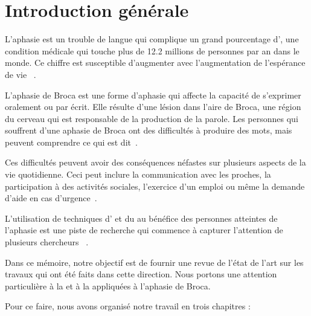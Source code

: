 \chapter*{Introduction générale}
\label{chap.intro}

L'aphasie est un trouble de langue qui complique un grand pourcentage d',
une condition médicale qui touche plus de 12.2 millions de personnes par an dans le monde.
Ce chiffre est susceptible d'augmenter avec l'augmentation de l'espérance de vie%
~\cite{Feigin_Brainin_Norrving_Martins_Sacco_Hacke_Fisher_Pandian_Lindsay_2022}.

L'aphasie de Broca est une forme d'aphasie qui affecte la capacité de s'exprimer oralement ou par écrit.
Elle résulte d'une lésion dans l'aire de Broca,
une région du cerveau qui est responsable de la production de la parole.
Les personnes qui souffrent d'une aphasie de Broca ont des difficultés à produire des mots,
mais peuvent comprendre ce qui est dit~\cite{Chapey_2008}.

Ces difficultés peuvent avoir des conséquences néfastes sur plusieurs aspects de la vie quotidienne.
Ceci peut inclure la communication avec les proches,
la participation à des activités sociales,
l'exercice d'un emploi
ou même la demande d'aide en cas d'urgence~\cite{Hallowell_2017}.

L'utilisation de techniques d' et du  
au bénéfice des personnes atteintes de l'aphasie est une piste de recherche  
qui commence à capturer l'attention de plusieurs chercheurs%
~\cite{Smaili_Langlois_Pribil_2022,Qin_Lee_Kong_Lin_2022,Misra_Mishra_Gandhi_2022}.

Dans ce mémoire, notre objectif est de fournir une revue de l'état de l'art
sur les travaux qui ont été faits dans cette direction.
Nous portons une attention particulière à la  et à la 
appliquées à l'aphasie de Broca.

Pour ce faire, nous avons organisé notre travail en trois chapitres :

